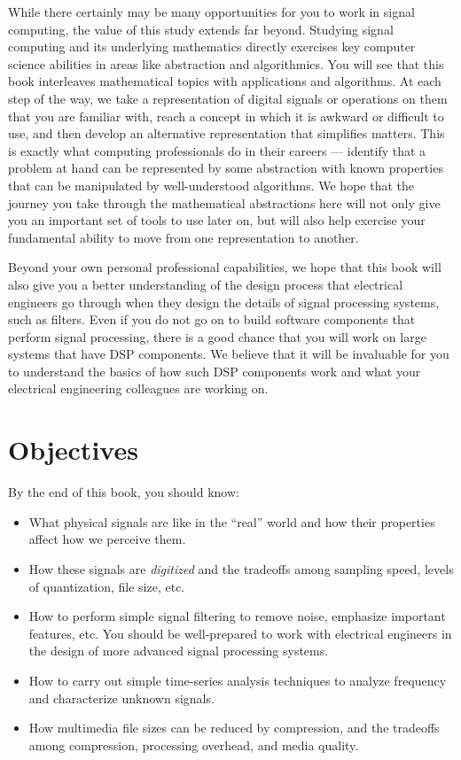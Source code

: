 While there certainly may be many opportunities for you to work in
signal computing, the value of this study extends far beyond. Studying
signal computing and its underlying mathematics directly exercises key
computer science abilities in areas like abstraction and
algorithmics. You will see that this book interleaves mathematical
topics with applications and algorithms. At each step of the way, we
take a representation of digital signals or operations on them that you
are familiar with, reach a concept in which it is awkward or difficult
to use, and then develop an alternative representation that simplifies
matters. This is exactly what computing professionals do in their
careers --- identify that a problem at hand can be represented by some
abstraction with known properties that can be manipulated by
well-understood algorithms. We hope that the journey you take through
the mathematical abstractions here will not only give you an important
set of tools to use later on, but will also help exercise your
fundamental ability to move from one representation to another.

Beyond your own personal professional capabilities, we hope that this
book will also give you a better understanding of the design process
that electrical engineers go through when they design the details of
signal processing systems, such as filters. Even if you do not go on
to build software components that perform signal processing, there is
a good chance that you will work on large systems that have DSP
components. We believe that it will be invaluable for you to
understand the basics of how such DSP components work and what your
electrical engineering colleagues are working on.

\section*{Objectives}

By the end of this book, you should know:

\begin{itemize}
\item What physical signals are like in the ``real'' world and how
  their properties affect how we perceive them.
\item How these signals are \emph{digitized} and the tradeoffs among
  sampling speed, levels of quantization, file size, etc.
\item How to perform simple signal filtering to remove noise,
  emphasize important features, etc.  You should be well-prepared to
  work with electrical engineers in the design of more advanced signal
  processing systems.
\item How to carry out simple time-series analysis techniques to
  analyze frequency and characterize unknown signals.
\item How multimedia file sizes can be reduced by compression, and the
  tradeoffs among compression, processing overhead, and media quality.
\end{itemize}

